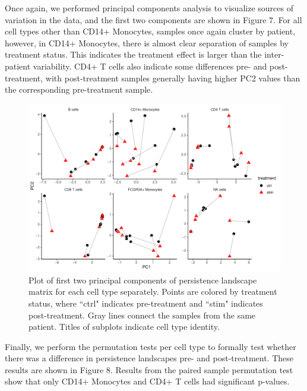\documentclass[11pt]{article}
\begin{document}
Once again, we performed principal components analysis to visualize sources of variation in the data, and the first two components are shown in Figure 7. For all cell types other than CD14+ Monocytes, samples once again cluster by patient, however, in CD14+ Monocytes, there is almost clear separation of samples by treatment status. This indicates the treatment effect is larger than the inter-patient variability. CD4+ T cells also indicate some differences pre- and post-treatment, with post-treatment samples generally having higher PC2 values than the corresponding pre-treatment sample.

\begin{figure}[!htb]
    \centering
	\includegraphics[width=14cm]{results/combined_persistence_landscape_pca.pdf}
    \caption{Plot of first two principal components of persistence landscape matrix for each cell type separately. Points are colored by treatment status, where ``ctrl" indicates pre-treatment and ``stim" indicates post-treatment. Gray lines connect the samples from the same patient. Titles of subplots indicate cell type identity.}
\end{figure}

Finally, we perform the permutation tests per cell type to formally test whether there was a difference in persistence landscapes pre- and post-treatment. These results are shown in Figure 8. Results from the paired sample permutation test show that only CD14+ Monocytes and CD4+ T cells had significant p-values. 
\end{document}
